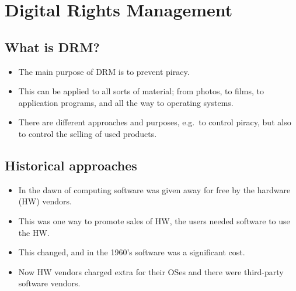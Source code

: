 \mode*




\section{Digital Rights Management}

\subsection{What is DRM?}

\begin{frame}
  \begin{itemize}
    \item The main purpose of DRM is to prevent piracy.

    \item This can be applied to all sorts of material; from photos, to films, 
      to application programs, and all the way to operating systems.

    \item There are different approaches and purposes, e.g.\ to control piracy, 
      but also to control the selling of used products.

  \end{itemize}
\end{frame}

\subsection{Historical approaches}

\begin{frame}
  \begin{itemize}
    \item In the dawn of computing software was given away for free by the 
      hardware (HW) vendors.

    \item This was one way to promote sales of HW, the users needed software to 
      use the HW\@.

    \item This changed, and in the 1960's software was a significant cost.

    \item Now HW vendors charged extra for their OSes and there were 
      third-party software vendors.
  \end{itemize}
\end{frame}

